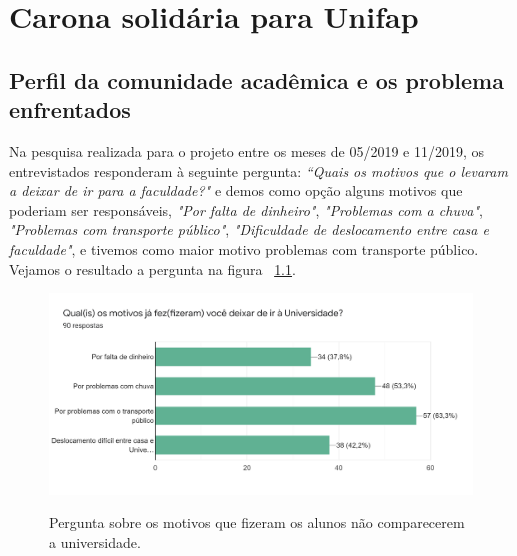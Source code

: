 %
%


\chapter{Carona solidária para Unifap}\label{chap:Carona solidária para Unifap}  

\section{Perfil da comunidade acadêmica e os problema enfrentados}

Na pesquisa realizada para o projeto entre os meses de 05/2019 e 11/2019, os entrevistados responderam à seguinte pergunta: \textit{“Quais os motivos que o levaram a deixar de ir para a faculdade?"} e demos como opção alguns motivos que poderiam ser responsáveis, \textit{"Por falta de dinheiro"}, \textit{"Problemas com a chuva"}, \textit{"Problemas com transporte público"}, \textit{"Dificuldade de deslocamento entre casa e faculdade"}, e tivemos como maior motivo problemas com transporte público. Vejamos o resultado a pergunta na figura ~\ref{fig:dadosmeiodetransporte}.




\begin{figure}[!hbtp]
	\centering
	\caption{Pergunta sobre os motivos que fizeram os alunos não comparecerem a universidade.}
	\includegraphics[width=1.0\textwidth]{./04-figuras/questionario/1.png}
	\label{fig:dadosmeiodetransporte}
\end{figure}

